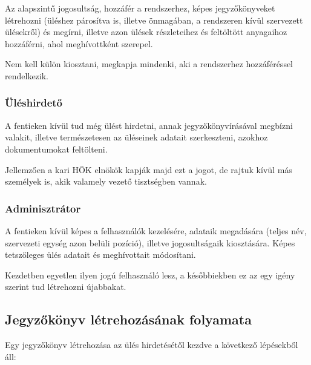 \documentclass[a4paper,12pt,oneside]{report}
\begin{document}
Az alapszintű jogosultság, hozzáfér a rendszerhez, képes jegyzőkönyveket létrehozni (üléshez párosítva is, illetve önmagában, a rendszeren kívül szervezett ülésekről) és megírni, illetve azon ülések részleteihez és feltöltött anyagaihoz hozzáférni, ahol meghívottként szerepel.

Nem kell külön kiosztani, megkapja mindenki, aki a rendszerhez hozzáféréssel rendelkezik.

\subsubsection*{Üléshirdető}

A fentieken kívül tud még ülést hirdetni, annak jegyzőkönyvírásával megbízni valakit, illetve természetesen az üléseinek adatait szerkeszteni, azokhoz dokumentumokat feltölteni.

Jellemzően a kari HÖK elnökök kapják majd ezt a jogot, de rajtuk kívül más személyek is, akik valamely vezető tisztségben vannak.

\subsubsection*{Adminisztrátor}

A fentieken kívül képes a felhasználók kezelésére, adataik megadására (teljes név, szervezeti egység azon belüli pozíció), illetve jogosultságaik kiosztására. Képes tetszőleges ülés adatait és meghívottait módosítani.

Kezdetben egyetlen ilyen jogú felhasználó lesz, a későbbiekben ez az egy igény szerint tud létrehozni újabbakat.

\subsection{Jegyzőkönyv létrehozásának folyamata}

Egy jegyzőkönyv létrehozása az ülés hirdetésétől kezdve a következő lépésekből áll:
\end{document}
